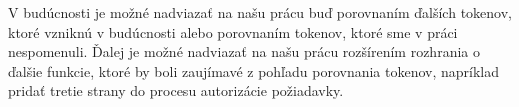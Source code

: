 V budúcnosti je možné nadviazať na našu prácu buď porovnaním ďalších tokenov, ktoré vzniknú v budúcnosti alebo porovnaním tokenov, ktoré sme v práci nespomenuli. Ďalej je možné nadviazať na našu prácu rozšírením rozhrania o ďalšie funkcie, ktoré by boli zaujímavé z pohľadu porovnania tokenov, napríklad pridať tretie strany do procesu autorizácie požiadavky.